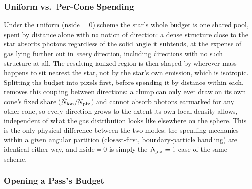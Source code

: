 \subsubsection{Uniform vs.\ Per-Cone Spending}

Under the uniform
($\text{nside}=0$) scheme the star's whole budget is one shared pool,
spent by distance alone with no notion of direction: a dense structure
close to the star absorbs photons regardless of the solid angle it
subtends, at the expense of gas lying further out in
\emph{every} direction, including directions with no such structure at
all. The resulting ionized region is then shaped by wherever mass
happens to sit nearest the star, not by the star's own emission, which
is isotropic. Splitting the budget into pixels first, before spending
it by distance within each, removes this coupling between directions:
a clump can only ever draw on its own cone's fixed share
($\dot N_{\rm ion}/N_{\rm pix}$) and cannot absorb photons earmarked
for any other cone, so every direction grows to the extent its own
local density allows, independent of what the gas distribution looks
like elsewhere on the sphere. This is the only physical difference
between the two modes: the spending mechanics within a given angular
partition (closest-first, boundary-particle handling) are identical
either way, and $\text{nside}=0$ is simply the $N_{\rm pix}=1$ case of
the same scheme.

\subsubsection{Opening a Pass's Budget}

